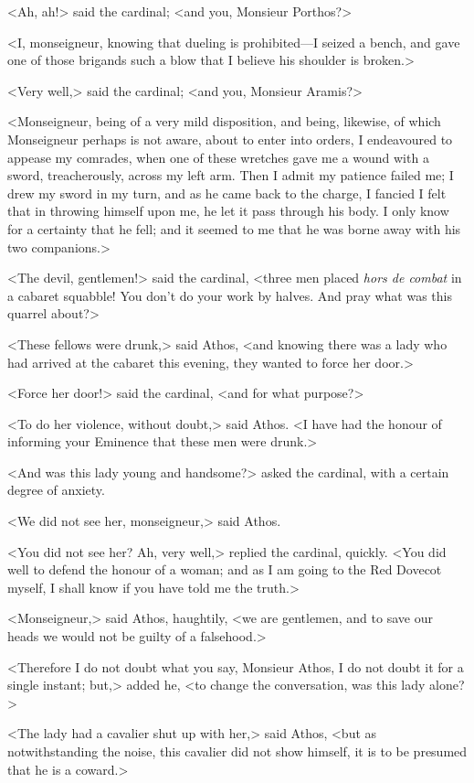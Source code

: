 <Ah, ah!> said the cardinal; <and you, Monsieur Porthos?> 

<I, monseigneur, knowing that dueling is prohibited---I seized a bench, and gave one of those brigands such a blow that I believe his shoulder is broken.> 

<Very well,> said the cardinal; <and you, Monsieur Aramis?> 

<Monseigneur, being of a very mild disposition, and being, likewise, of which Monseigneur perhaps is not aware, about to enter into orders, I endeavoured to appease my comrades, when one of these wretches gave me a wound with a sword, treacherously, across my left arm. Then I admit my patience failed me; I drew my sword in my turn, and as he came back to the charge, I fancied I felt that in throwing himself upon me, he let it pass through his body. I only know for a certainty that he fell; and it seemed to me that he was borne away with his two companions.> 

<The devil, gentlemen!> said the cardinal, <three men placed \textit{hors de combat} in a cabaret squabble! You don't do your work by halves. And pray what was this quarrel about?> 

<These fellows were drunk,> said Athos, <and knowing there was a lady who had arrived at the cabaret this evening, they wanted to force her door.> 

<Force her door!> said the cardinal, <and for what purpose?> 

<To do her violence, without doubt,> said Athos. <I have had the honour of informing your Eminence that these men were drunk.> 

<And was this lady young and handsome?> asked the cardinal, with a certain degree of anxiety. 

<We did not see her, monseigneur,> said Athos. 

<You did not see her? Ah, very well,> replied the cardinal, quickly. <You did well to defend the honour of a woman; and as I am going to the Red Dovecot myself, I shall know if you have told me the truth.> 

<Monseigneur,> said Athos, haughtily, <we are gentlemen, and to save our heads we would not be guilty of a falsehood.> 

<Therefore I do not doubt what you say, Monsieur Athos, I do not doubt it for a single instant; but,> added he, <to change the conversation, was this lady alone?> 

<The lady had a cavalier shut up with her,> said Athos, <but as notwithstanding the noise, this cavalier did not show himself, it is to be presumed that he is a coward.> 

